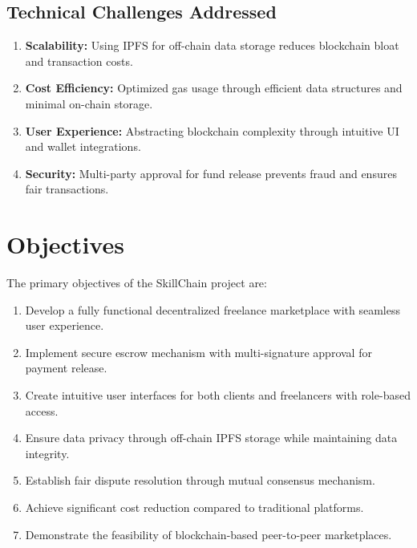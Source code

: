 \subsection{Technical Challenges Addressed}

\begin{enumerate}[leftmargin=*]
    \item \textbf{Scalability:} Using IPFS for off-chain data storage reduces blockchain bloat and transaction costs.
    \item \textbf{Cost Efficiency:} Optimized gas usage through efficient data structures and minimal on-chain storage.
    \item \textbf{User Experience:} Abstracting blockchain complexity through intuitive UI and wallet integrations.
    \item \textbf{Security:} Multi-party approval for fund release prevents fraud and ensures fair transactions.
\end{enumerate}

\section{Objectives}

The primary objectives of the SkillChain project are:

\begin{enumerate}[leftmargin=*]
    \item Develop a fully functional decentralized freelance marketplace with seamless user experience.
    \item Implement secure escrow mechanism with multi-signature approval for payment release.
    \item Create intuitive user interfaces for both clients and freelancers with role-based access.
    \item Ensure data privacy through off-chain IPFS storage while maintaining data integrity.
    \item Establish fair dispute resolution through mutual consensus mechanism.
    \item Achieve significant cost reduction compared to traditional platforms.
    \item Demonstrate the feasibility of blockchain-based peer-to-peer marketplaces.
\end{enumerate}